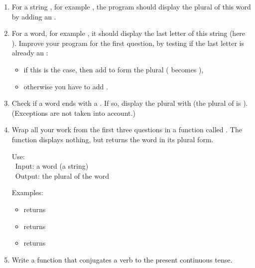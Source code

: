 \documentclass[11pt,class=report,crop=false]{standalone}
\begin{document}
\begin{activite}


\begin{enumerate}
  \item For a string , for example , the program should display the plural of this word by adding an . 
  
  \item For a word, for example , it should display the last letter of this string (here ). Improve your program for the first question, by testing if the last letter is already an :
  \begin{itemize}
    \item if this is the case, then add  to form the plural ( becomes ),
    \item otherwise you have to add .
  \end{itemize} 

  \item Check if a word ends with a . If so, display the plural with  (the plural of 
  is ). (Exceptions are not taken into account.)
  
  \item Wrap all your work from the first three questions in a function called . The function displays nothing, but returns the word in its plural form.
  
  \medskip
  
  \begin{fonction}[\ci{plural()}]
  Use:  \\\
  Input: a word (a string) \\\
  Output: the plural of the word 
  
  \bigskip
  
  Examples: 
  \begin{itemize}
    \item {} returns 
    \item {} returns   
    \item \ci{plural("city")} returns          
  \end{itemize}     
  \end{fonction}

  \item Write a function  that conjugates a verb to the present continuous tense.
  

\end{enumerate}
\end{activite}
\end{document}
